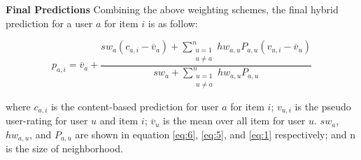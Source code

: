 \noindent \textbf{Final Predictions} Combining the above weighting schemes, the final hybrid prediction for a user \(a\) for item \(i\) is as follow:

\begin{displaymath}
p_{a,i} = \overline{v}_a + \frac{sw_a \left(c_{a,i} - \overline{v}_a \right) + \sum\limits_{\substack{ u=1 \\ u \neq a}}^{n} hw_{a,u}P_{a,u} \left(v_{u,i} - \overline{v}_u \right) } {sw_a +\sum\limits_{\substack{ u=1 \\ u \neq a}}^{n} hw_{a,u}P_{a,u}}
\end{displaymath}

where \(c_{a,i}\) is the content-based prediction for user \(a\) for item  \(i\); \(v_{u,i}\) is the pseudo user-rating for user \(u\) and item \(i\); \(\overline{v}_u\) is the mean over all item for user \(u\). \(sw_a\), \(hw_{a,u}\), and \(P_{a,u}\) are shown in equation \eqref{eq:6}, \eqref{eq:5}, and \eqref{eq:1} respectively; and n is the size of neighborhood. 
